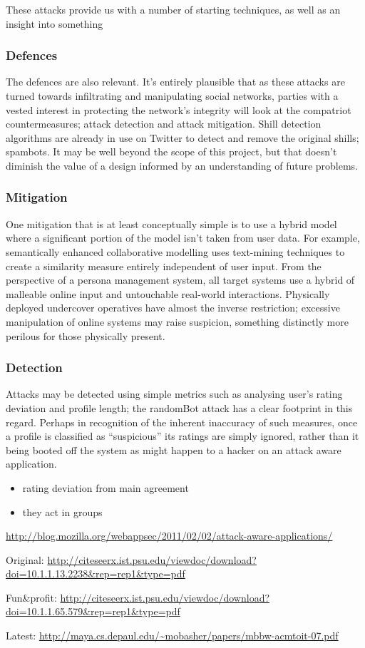 These attacks provide us with a number of starting techniques, as well as an insight into something

\subsubsection{Defences}

The defences are also relevant. It's entirely plausible that as these attacks
are turned towards infiltrating and manipulating social networks, parties with a
vested interest in protecting the network's integrity will look at the
compatriot countermeasures; attack detection and attack mitigation. Shill
detection algorithms are already in use on Twitter to detect and remove the
original shills; spambots. It may be well beyond the scope of this project, but
that doesn't diminish the value of a design informed by an understanding of
future problems.

\subsubsection{Mitigation}

One mitigation that is at least conceptually simple  is to use a hybrid model
where a significant portion of the model isn't taken from user data. For
example, semantically enhanced collaborative modelling uses text-mining
techniques to create a similarity measure entirely independent of user input.
From the perspective of a persona management system, all target systems use a
hybrid of malleable online input and untouchable real-world interactions.
Physically deployed undercover operatives have almost the inverse restriction;
excessive manipulation of online systems may raise suspicion, something
distinctly more perilous for those physically present.

\subsubsection{Detection}
Attacks may be detected using simple metrics such as analysing user's rating
deviation and profile length; the randomBot attack has a clear footprint in this
regard. Perhaps in recognition of the inherent inaccuracy of such measures, once
a profile is classified as ``suspicious'' its ratings are simply ignored, rather
than it being booted off the system as might happen to a hacker on an attack
aware application.

\begin{itemize}
	\item rating deviation from main agreement
	\item they act in groups
\end{itemize}


\url{http://blog.mozilla.org/webappsec/2011/02/02/attack-aware-applications/}

Original: \url{http://citeseerx.ist.psu.edu/viewdoc/download?doi=10.1.1.13.2238\&rep=rep1\&type=pdf}

Fun\&profit: \url{http://citeseerx.ist.psu.edu/viewdoc/download?doi=10.1.1.65.579\&rep=rep1\&type=pdf}

Latest: \url{http://maya.cs.depaul.edu/~mobasher/papers/mbbw-acmtoit-07.pdf}